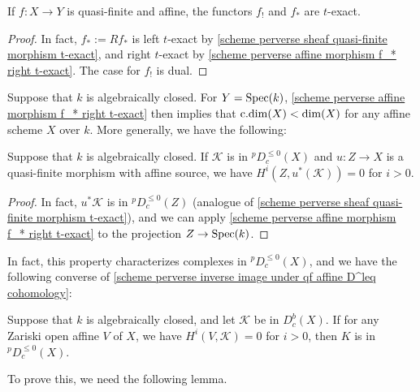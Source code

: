 \begin{corollary}\label{scheme perverse quasi-finite affine f_* f_! t-exact}
If $f:X\to Y$ is quasi-finite and affine, the functors $f_!$ and $f_*$ are $t$-exact.
\end{corollary}
\begin{proof}
In fact, $f_*:=Rf_*$ is left $t$-exact by \cref{scheme perverse sheaf quasi-finite morphism t-exact}, and right $t$-exact by \cref{scheme perverse affine morphism f_* right t-exact}. The case for $f_!$ is dual. 
\end{proof}

Suppose that $k$ is algebraically closed. For $Y=\mathrm{Spec}(k)$, \cref{scheme perverse affine morphism f_* right t-exact} then implies that $\mathrm{c.dim}(X)<\dim(X)$ for any affine scheme $X$ over $k$. More generally, we have the following:

\begin{corollary}\label{scheme perverse inverse image under qf affine D^leq cohomology}
Suppose that $k$ is algebraically closed. If $\mathscr{K}$ is in ${^p\!D^{\leq 0}_c}(X)$ and $u:Z\to X$ is a quasi-finite morphism with affine source, we have $H^i(Z,u^*(\mathscr{K}))=0$ for $i>0$.
\end{corollary}
\begin{proof}
In fact, $u^*\mathscr{K}$ is in ${^p\!D_c^{\leq 0}}(Z)$ (analogue of \cref{scheme perverse sheaf quasi-finite morphism t-exact}), and we can apply \cref{scheme perverse affine morphism f_* right t-exact} to the projection $Z\to\mathrm{Spec}(k)$.
\end{proof}

In fact, this property characterizes complexes in ${^p\!D^{\leq 0}_c}(X)$, and we have the following converse of \cref{scheme perverse inverse image under qf affine D^leq cohomology}:

\begin{corollary}\label{scheme perverse D^leq if negative cohomology on open affine}
Suppose that $k$ is algebraically closed, and let $\mathscr{K}$ be in $D^b_c(X)$. If for any Zariski open affine $V$ of $X$, we have $H^i(V,\mathscr{K})=0$ for $i>0$, then $K$ is in ${^p\!D_c^{\leq 0}}(X)$.
\end{corollary}

To prove this, we need the following lemma.

